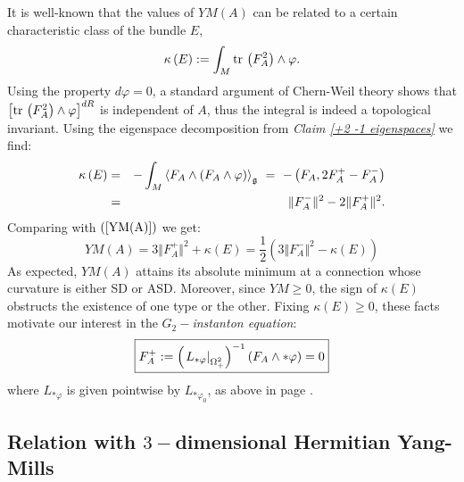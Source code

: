 \documentclass{article}
\newcommand{\func}[1]{\textnormal {#1\,}}
\begin{document}
It is well-known that the values of $YM\left( A\right) $ can be related to a certain
characteristic class of the bundle $E$,%
\begin{equation*}
        \kappa \left( E\right) :=\int_{M}%
        \func{tr}\left( F_{A}^{2}\right) \wedge \varphi .
\end{equation*}%
Using the property $d\varphi =0$, a standard argument of Chern-Weil theory \cite{Milnor} shows that $\left[ \func{tr}\left(
F_{A}^{2}\right) \wedge \varphi \right]^{dR}$ is independent of $A$, thus the
integral is indeed a topological invariant. Using  the eigenspace decomposition from \emph{Claim \ref{+2 -1 eigenspaces}} we find:%
\begin{eqnarray*}        %
        \kappa \left( E\right) &=&
        -\int_{M}\left\langle F_{A}\wedge 
        \left( F_{A}\wedge\varphi\right) \right\rangle _{\mathfrak{g}}
        \notag 
        \ =\ -\left(F_{A},2F_{A}^{+}-F_{A}^{-}\right)  \notag \\
        &=&\Vert F_{A}^{-}\Vert ^{2}
        -2\Vert F_{A}^{+}\Vert^{2}.
\end{eqnarray*}
Comparing with $\left( \ref{YM(A)}\right) $ we get:%
\begin{equation*}
        YM(A)=3\Vert F_{A}^{+}\Vert ^{2}
        +\kappa \left( E\right) 
        =\frac{1}{2}\left( 3\Vert F_{A}^{-}\Vert ^{2}
        -\kappa \left( E\right) \right)
\end{equation*}%
As expected,  $YM\left( A\right) $ attains its absolute minimum at a
connection whose curvature is either SD or ASD. Moreover, since $YM\geq0$, the sign of  $\kappa(E)$ obstructs the existence of one type or the other. Fixing $\kappa(E)\geq0$, these facts motivate our interest in the 
$G_{2}-$\emph{instanton equation}:%
\begin{equation}        \label{G2-instanton}
                        \index{G2@$G_{2}$!-instanton@$-$instanton}
        \boxed{F_{A}^{+}:=\left(\left.L_{\ast\varphi}
        \right\vert_{\Omega^2_+}\right)^{-1} \left(F_{A}\wedge*\varphi\right)=0}
\end{equation}
where $L_{\ast\varphi}$ is given pointwise by $L_{\ast\varphi_0}$, as above in page \pageref{eq Lphi0}.

\newpage
\subsection{Relation with $3-$dimensional Hermitian Yang-Mills}  
\label{Subsection Hemitian YM}
\end{document}

